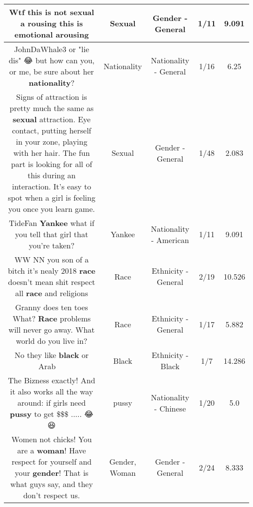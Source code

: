 \documentclass[11pt]{article}
\newlength\mylength
\begin{document}
\begin{center}
\begin{longtable}{|C{.65\mylength}|C{.30\mylength}|C{.12\mylength}|C{.12\mylength}|C{.12\mylength}|}
  \small Wtf this is not \textbf{sexual} a rousing this is emotional arousing\normalsize   & Sexual & Gender - General & 1/11 & 9.091 \\  \hline
  \small JohnDaWhale3  or "lie dis" 😂 but how can you, or me, be sure about her \textbf{nationality}?\normalsize   & Nationality & Nationality - General & 1/16 & 6.25 \\  \hline
  \small Signs of attraction is pretty much the same as \textbf{sexual} attraction. Eye contact,  putting herself in your zone, playing with her hair. The fun part is looking for all of this during an interaction. It's easy to spot when a girl is feeling you once you learn game.\normalsize   & Sexual & Gender - General & 1/48 & 2.083 \\  \hline
  \small TideFan \textbf{Yankee} what if you tell that girl that you're taken?\normalsize   & Yankee & Nationality - American & 1/11 & 9.091 \\  \hline
  \small WW NN you son of a bitch it's nealy 2018 \textbf{race} doesn't mean shit respect all \textbf{race} and religions\normalsize   & Race & Ethnicity - General & 2/19 & 10.526 \\  \hline
  \small Granny does ten toes What? \textbf{Race} problems will never go away. What world do you live in?\normalsize   & Race & Ethnicity - General & 1/17 & 5.882 \\  \hline
  \small No they like \textbf{black} or Arab 🤣🤣🤣\normalsize   & Black & Ethnicity - Black & 1/7 & 14.286 \\  \hline
  \small The Bizness  exactly! And it also works all the way around: if girls need \textbf{pussy} to get \$\$\$ ..... 😂😆\normalsize   & pussy & Nationality - Chinese & 1/20 & 5.0 \\  \hline
  \small Women not chicks! You are a \textbf{woman}! Have respect for yourself and your \textbf{gender}! That is what guys say, and they don't respect us.\normalsize   & Gender, Woman & Gender - General & 2/24 & 8.333 \\  \hline

\end{longtable}
\end{center}
\end{document}
